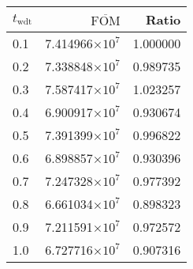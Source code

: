 \begin{tabular}{lrr}
\toprule
$t_{\mathrm{wdt}}$ & $\overline{\mathrm{FOM}}$ &    Ratio \\
\midrule
               0.1 &   7.414966$\times 10^{7}$ & 1.000000 \\
               0.2 &   7.338848$\times 10^{7}$ & 0.989735 \\
               0.3 &   7.587417$\times 10^{7}$ & 1.023257 \\
               0.4 &   6.900917$\times 10^{7}$ & 0.930674 \\
               0.5 &   7.391399$\times 10^{7}$ & 0.996822 \\
               0.6 &   6.898857$\times 10^{7}$ & 0.930396 \\
               0.7 &   7.247328$\times 10^{7}$ & 0.977392 \\
               0.8 &   6.661034$\times 10^{7}$ & 0.898323 \\
               0.9 &   7.211591$\times 10^{7}$ & 0.972572 \\
               1.0 &   6.727716$\times 10^{7}$ & 0.907316 \\
\bottomrule
\end{tabular}
